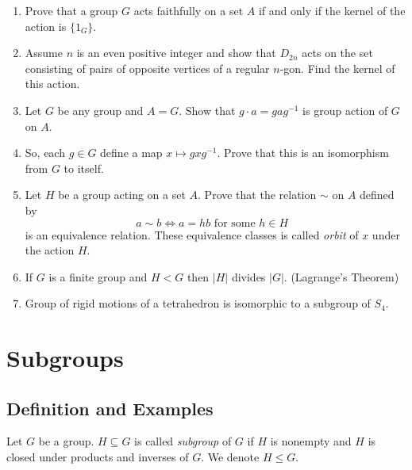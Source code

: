 \documentclass[12pt, a4paper, openany, twoside]{book}
\theoremstyle{definition}
\theoremstyle{remark}
\theoremstyle{plain}
\numberwithin{equation}{section}
\begin{document}
\begin{tcolorbox}[colback=yellow!10!white,colframe=violet!75!white,title=Exercise Sec 1.7.,breakable]

\begin{enumerate}
    \item Prove that a group $G$ acts faithfully on a set $A$ if and only if the kernel of the action is $\{1_G\}$. 
    \item Assume $n$ is an even positive integer and show that $D_{2n}$ acts on the set consisting of pairs of opposite vertices of a regular $n$-gon. Find the kernel of this action.
    \item Let $G$ be any group and $A = G$. Show that $g \cdot a = gag^{-1}$ is group action of $G$ on $A$. 
    \item So, each $g \in G$ define a map $x \mapsto gxg^{-1}$. Prove that this is an isomorphism from $G$ to itself. 
    \item Let $H$ be a group acting on a set $A$. Prove that the relation $\sim$ on $A$ defined by 
    \[a \sim b \iff a = hb \text{ for some $h \in H$ }\]
    is an equivalence relation. These equivalence classes is called \textit{orbit} of $x$ under the action $H$.
    \item If $G$ is a finite group and $H < G$ then $|H|$ divides $|G|$. (Lagrange's Theorem)
    \item Group of rigid motions of a tetrahedron is isomorphic to a subgroup of $S_4$.  
\end{enumerate}

\end{tcolorbox}

\newpage 

\chapter{Subgroups}

\section{Definition and Examples}

\begin{tcolorbox}[colback=yellow!10!white,colframe=brown!75!black,title=Subgroup]

Let $G$ be a group. $H \subseteq G$ is called \textit{subgroup} of $G$ if 
$H$ is nonempty and $H$ is closed under products and inverses of $G$. We denote $H \leq G$. 

\end{tcolorbox}
\end{document}
